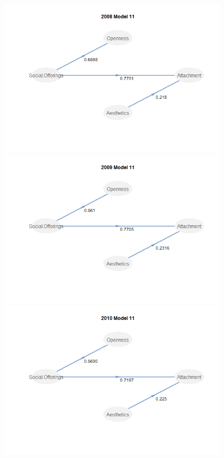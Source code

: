 \documentclass[11pt]{asaproc}
\begin{document}
\begin{figure}[H]
\begin{framed}
\begin{minipage}[b]{0.45\linewidth}
\centering
\includegraphics[width=\textwidth]{Mod32008.png}
\end{minipage}
\hspace{0.5cm}
\begin{minipage}[b]{0.45\linewidth}
\centering
\includegraphics[width=\textwidth]{Mod32009.png}
\end{minipage}
\hspace{0.5cm}
\begin{minipage}[b]{0.45\linewidth}
\centering
\includegraphics[width=\textwidth]{Mod32010.png}

\end{minipage}
\end{framed}
\end{figure}
\end{document}
